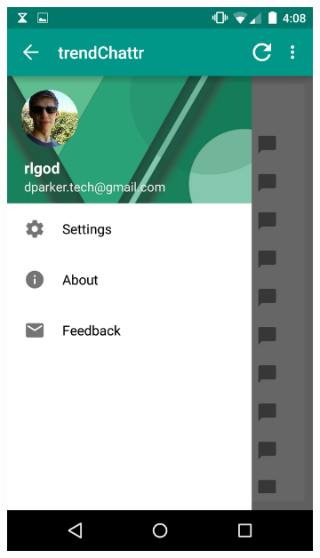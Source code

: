 \documentclass[11pt,english,numbers=endperiod,parskip=half]{scrartcl}
\begin{document}
\begin{figure}[H]
\begin{subfigure}{.5\textwidth}
      \includegraphics[width=.7\linewidth]{images/ss2.png}
    \end{subfigure}
  \end{figure}
\end{document}
